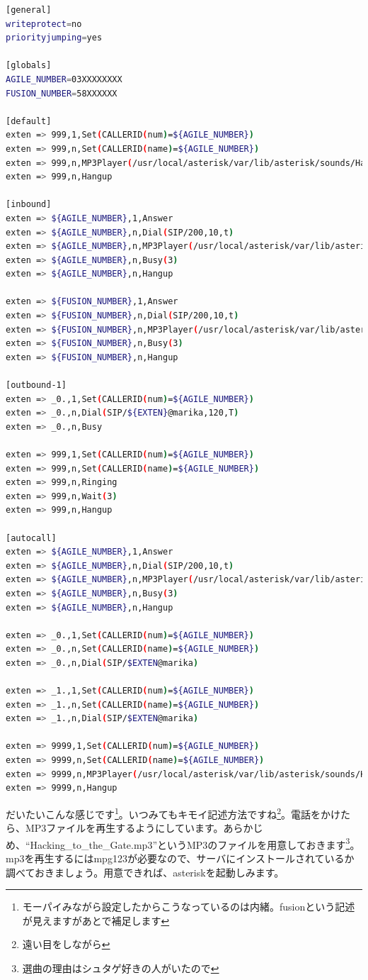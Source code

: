 \begin{lstlisting}[language=bash]
[general] 
writeprotect=no 
priorityjumping=yes 

[globals] 
AGILE_NUMBER=03XXXXXXXX
FUSION_NUMBER=58XXXXXX

[default] 
exten => 999,1,Set(CALLERID(num)=${AGILE_NUMBER}) 
exten => 999,n,Set(CALLERID(name)=${AGILE_NUMBER})
exten => 999,n,MP3Player(/usr/local/asterisk/var/lib/asterisk/sounds/Hacking_to_the_Gate.mp3) 
exten => 999,n,Hangup 

[inbound] 
exten => ${AGILE_NUMBER},1,Answer 
exten => ${AGILE_NUMBER},n,Dial(SIP/200,10,t) 
exten => ${AGILE_NUMBER},n,MP3Player(/usr/local/asterisk/var/lib/asterisk/sounds/Hacking_to_the_Gate.mp3) 
exten => ${AGILE_NUMBER},n,Busy(3)
exten => ${AGILE_NUMBER},n,Hangup 

exten => ${FUSION_NUMBER},1,Answer
exten => ${FUSION_NUMBER},n,Dial(SIP/200,10,t)
exten => ${FUSION_NUMBER},n,MP3Player(/usr/local/asterisk/var/lib/asterisk/sounds/Hacking_to_the_Gate.mp3)
exten => ${FUSION_NUMBER},n,Busy(3) 
exten => ${FUSION_NUMBER},n,Hangup

[outbound-1]
exten => _0.,1,Set(CALLERID(num)=${AGILE_NUMBER}) 
exten => _0.,n,Dial(SIP/${EXTEN}@marika,120,T)
exten => _0.,n,Busy 

exten => 999,1,Set(CALLERID(num)=${AGILE_NUMBER}) 
exten => 999,n,Set(CALLERID(name)=${AGILE_NUMBER})
exten => 999,n,Ringing
exten => 999,n,Wait(3)
exten => 999,n,Hangup

[autocall]
exten => ${AGILE_NUMBER},1,Answer
exten => ${AGILE_NUMBER},n,Dial(SIP/200,10,t) 
exten => ${AGILE_NUMBER},n,MP3Player(/usr/local/asterisk/var/lib/asterisk/sounds/Hacking_to_the_Gate.mp3)
exten => ${AGILE_NUMBER},n,Busy(3)
exten => ${AGILE_NUMBER},n,Hangup

exten => _0.,1,Set(CALLERID(num)=${AGILE_NUMBER})
exten => _0.,n,Set(CALLERID(name)=${AGILE_NUMBER})
exten => _0.,n,Dial(SIP/$EXTEN@marika)

exten => _1.,1,Set(CALLERID(num)=${AGILE_NUMBER})
exten => _1.,n,Set(CALLERID(name)=${AGILE_NUMBER})
exten => _1.,n,Dial(SIP/$EXTEN@marika)

exten => 9999,1,Set(CALLERID(num)=${AGILE_NUMBER})
exten => 9999,n,Set(CALLERID(name)=${AGILE_NUMBER})
exten => 9999,n,MP3Player(/usr/local/asterisk/var/lib/asterisk/sounds/Hacking_to_the_Gate.mp3)
exten => 9999,n,Hangup
\end{lstlisting}

だいたいこんな感じです\footnote{モーパイみながら設定したからこうなっているのは内緒。fusionという記述が見えますがあとで補足します}。いつみてもキモイ記述方法ですね\footnote{遠い目をしながら}。電話をかけたら、MP3ファイルを再生するようにしています。あらかじめ、``Hacking\_to\_the\_Gate.mp3''というMP3のファイルを用意しておきます\footnote{選曲の理由はシュタゲ好きの人がいたので}。mp3を再生するにはmpg123が必要なので、サーバにインストールされているか調べておきましょう。用意できれば、asteriskを起動しみます。

